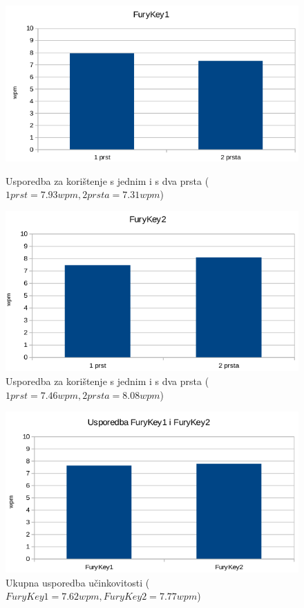 \documentclass[times, utf8, zavrsni, numeric]{fer}
\begin{document}
\begin{appendices}
\begin{figure}[htb]
  \centering
  \begin{minipage}[b]{0.48\textwidth}
    \includegraphics[width=\textwidth]{img/furykey1_12.png}
    \caption{Usporedba za korištenje s jednim i s dva prsta ($1 prst=7.93wpm, 2 prsta=7.31wpm$)}
    \label{chart:furykey1_12}
  \end{minipage}
  \hfill
  \begin{minipage}[b]{0.48\textwidth}
    \includegraphics[width=\textwidth]{img/furykey2_12.png}
    \caption{Usporedba za korištenje s jednim i s dva prsta ($1 prst=7.46wpm, 2 prsta=8.08wpm$)}
    \label{chart:furykey2_12}
  \end{minipage}
\end{figure}

\begin{figure}[htb]
\centering
\includegraphics[width=12cm]{img/usporedba_ukupno.png}
\caption{Ukupna usporedba učinkovitosti ($FuryKey1=7.62wpm, FuryKey2=7.77wpm$)}
\label{chart:uk}
\end{figure}
\end{appendices}
\end{document}
